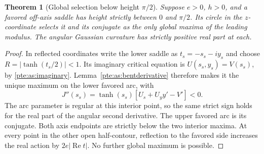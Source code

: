\documentclass[11pt,a4paper]{article}
\numberwithin{equation}{section}
\newtheorem{theorem}{Theorem}[section]
\theoremstyle{definition}
\theoremstyle{plain}
\begin{document}
\begin{theorem}[Global selection below height $\pi/2$]
\label{pte:as:lowheightselection}
Suppose $e>0$, $h>0$, and a favored off-axis saddle has height strictly
between $0$ and $\pi/2$.  Its circle in the $z$-coordinate selects it and
its conjugate as the only global maxima of the leading modulus.  The
angular Gaussian curvature has strictly positive real part at each.
\end{theorem}
\begin{proof}
In reflected coordinates write the lower saddle as $t_s=-s_s-iy_s$ and
choose $R=|\tanh(t_s/2)|<1$.  Its imaginary critical equation is
$U(s_s,y_s)=V(s_s)$, by \eqref{pte:as:imaginary}.  Lemma~\ref{pte:as:bentderivative}
therefore makes it the unique maximum on the lower favored arc, with
\[
 J''(s_s)=\tanh(s_s)[U_s+U_y y'-V']<0.
\]
The arc parameter is regular at this interior point, so the same strict
sign holds for the real part of the angular second derivative.  The
upper favored arc is its conjugate.  Both axis endpoints are strictly
below the two interior maxima.  At every point in the other open
half-contour, reflection to the favored side increases the real action
by $2e|\operatorname{Re}t|$.  No further global maximum is possible.
\end{proof}
\end{document}
